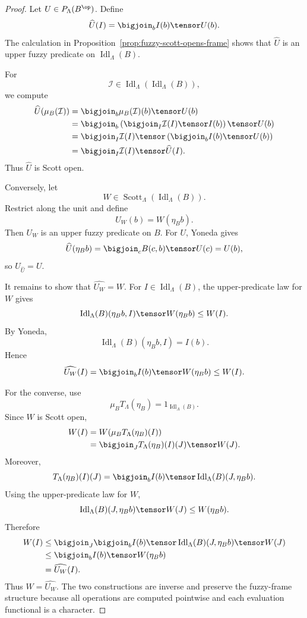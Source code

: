 \begin{proof}
Let \(U\in P_\Lambda(B^{\op})\).  Define
\[
    \widehat U(I)
    =
    \bigjoin_b I(b)\tensor U(b).
\]
The calculation in Proposition~\ref{prop:fuzzy-scott-opens-frame} shows that
\(\widehat U\) is an upper fuzzy predicate on
\(\operatorname{Idl}_\Lambda(B)\).

For
\[
    \mathcal I\in
    \operatorname{Idl}_\Lambda(\operatorname{Idl}_\Lambda(B)),
\]
we compute
\[
\begin{aligned}
    \widehat U(\mu_B(\mathcal I))
    &=
    \bigjoin_b \mu_B(\mathcal I)(b)\tensor U(b)\\
    &=
    \bigjoin_b
    \left(
        \bigjoin_I \mathcal I(I)\tensor I(b)
    \right)\tensor U(b)\\
    &=
    \bigjoin_I \mathcal I(I)\tensor
    \left(
        \bigjoin_b I(b)\tensor U(b)
    \right)\\
    &=
    \bigjoin_I \mathcal I(I)\tensor \widehat U(I).
\end{aligned}
\]
Thus \(\widehat U\) is Scott open.

Conversely, let
\[
    W\in\operatorname{Scott}_\Lambda(\operatorname{Idl}_\Lambda(B)).
\]
Restrict along the unit and define
\[
    U_W(b)=W(\eta_B b).
\]
Then \(U_W\) is an upper fuzzy predicate on \(B\).  For \(U\), Yoneda gives
\[
    \widehat U(\eta_B b)
    =
    \bigjoin_c B(c,b)\tensor U(c)
    =
    U(b),
\]
so \(U_{\widehat U}=U\).

It remains to show that \(\widehat{U_W}=W\).  For
\(I\in\operatorname{Idl}_\Lambda(B)\), the upper-predicate law for \(W\) gives
\[
    \operatorname{Idl}_\Lambda(B)(\eta_B b,I)
    \tensor W(\eta_B b)
    \leq
    W(I).
\]
By Yoneda,
\[
    \operatorname{Idl}_\Lambda(B)(\eta_B b,I)=I(b).
\]
Hence
\[
    \widehat{U_W}(I)
    =
    \bigjoin_b I(b)\tensor W(\eta_B b)
    \leq
    W(I).
\]

For the converse, use
\[
    \mu_B T_\Lambda(\eta_B)=1_{\operatorname{Idl}_\Lambda(B)}.
\]
Since \(W\) is Scott open,
\[
\begin{aligned}
    W(I)
    &=
    W(\mu_B T_\Lambda(\eta_B)(I))\\
    &=
    \bigjoin_J T_\Lambda(\eta_B)(I)(J)\tensor W(J).
\end{aligned}
\]
Moreover,
\[
    T_\Lambda(\eta_B)(I)(J)
    =
    \bigjoin_b I(b)\tensor
    \operatorname{Idl}_\Lambda(B)(J,\eta_B b).
\]
Using the upper-predicate law for \(W\),
\[
    \operatorname{Idl}_\Lambda(B)(J,\eta_B b)\tensor W(J)
    \leq
    W(\eta_B b).
\]
Therefore
\[
\begin{aligned}
    W(I)
    &\leq
    \bigjoin_J \bigjoin_b
    I(b)\tensor
    \operatorname{Idl}_\Lambda(B)(J,\eta_B b)\tensor W(J)\\
    &\leq
    \bigjoin_b I(b)\tensor W(\eta_B b)\\
    &=
    \widehat{U_W}(I).
\end{aligned}
\]
Thus \(W=\widehat{U_W}\).  The two constructions are inverse and preserve the
fuzzy-frame structure because all operations are computed pointwise and each
evaluation functional is a character.
\end{proof}

